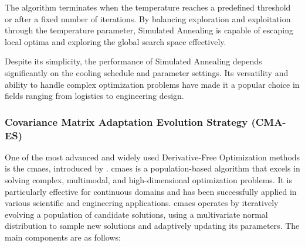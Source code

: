 The algorithm terminates when the temperature reaches a predefined threshold or after a fixed number of iterations. By balancing exploration and exploitation through the temperature parameter, Simulated Annealing is capable of escaping local optima and exploring the global search space effectively.

Despite its simplicity, the performance of Simulated Annealing depends significantly on the cooling schedule and parameter settings. Its versatility and ability to handle complex optimization problems have made it a popular choice in fields ranging from logistics to engineering design.


\subsubsection{Covariance Matrix Adaptation Evolution Strategy (CMA-ES)}
\label{subsubsection:cma_es}

One of the most advanced and widely used Derivative-Free Optimization methods is the \ac{cmaes}, introduced by \citet{hansen2001completely}. \ac{cmaes} is a population-based algorithm that excels in solving complex, multimodal, and high-dimensional optimization problems. It is particularly effective for continuous domains and has been successfully applied in various scientific and engineering applications.
\ac{cmaes} operates by iteratively evolving a population of candidate solutions, using a multivariate normal distribution to sample new solutions and adaptively updating its parameters. The main components are as follows:

